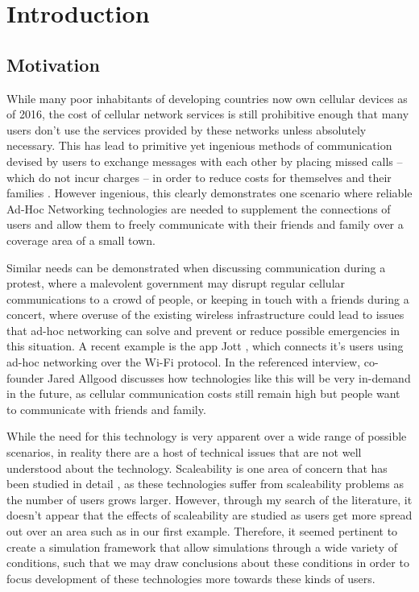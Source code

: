 \section{Introduction}
\subsection{Motivation}
While many poor inhabitants of developing countries now own cellular devices as of 2016, the cost
of cellular network services is still prohibitive enough that many users don't use the services
provided by these networks unless absolutely necessary.
This has lead to primitive yet ingenious methods of communication devised by users to exchange 
messages with each other by placing missed calls -- which do not incur charges -- in order to 
reduce costs for themselves and their families \cite{beeping}.
However ingenious, this clearly demonstrates one scenario where reliable Ad-Hoc Networking
technologies are needed to supplement the connections of users and allow them to freely 
communicate with their friends and family over a coverage area of a small town.

Similar needs can be demonstrated when discussing communication during a protest,
where a malevolent government may disrupt regular cellular communications to a crowd of people,
or keeping in touch with a friends during a concert, where overuse of the existing 
wireless infrastructure could lead to issues that ad-hoc networking can solve and prevent or 
reduce possible emergencies in this situation.
A recent example is the app Jott \cite{jott-techcrunch,jott-forbes}, which connects it's users
using ad-hoc networking over the Wi-Fi protocol. In the referenced interview, co-founder Jared 
Allgood discusses how technologies like this will be very in-demand in the future, as cellular 
communication costs still remain high but people want to communicate with friends and family.

While the need for this technology is very apparent over a wide range of possible scenarios,
in reality there are a host of technical issues that are not well understood about the technology.
Scaleability is one area of concern that has been studied in detail \cite{lee01}, as these
technologies suffer from scaleability problems as the number of users grows larger.
However, through my search of the literature, it doesn't appear that the effects of scaleability
are studied as users get more spread out over an area such as in our first example.
Therefore, it seemed pertinent to create a simulation framework that allow simulations through
a wide variety of conditions, such that we may draw conclusions about these conditions in order
to focus development of these technologies more towards these kinds of users.

